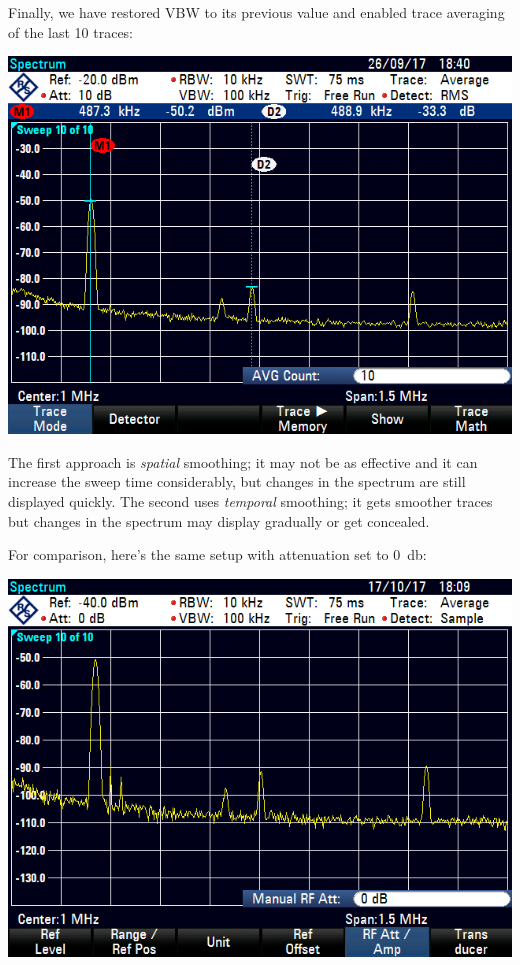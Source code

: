 \finishpage
\startpage

Finally, we have restored VBW to its previous value and enabled trace
averaging of the last 10 traces:

\includegraphics[width=\textwidth]{assets/1-5-3}

The first approach is \emph{spatial} smoothing; it may not be as effective and
it can increase the sweep time considerably, but changes in the spectrum are
still displayed quickly. The second uses \emph{temporal} smoothing; it gets
smoother traces but changes in the spectrum may display gradually or get
concealed.

For comparison, here's the same setup with attenuation set to \SI{0}{\decibel}:

\includegraphics[width=\textwidth]{assets/1-5-4}

\finishpage


